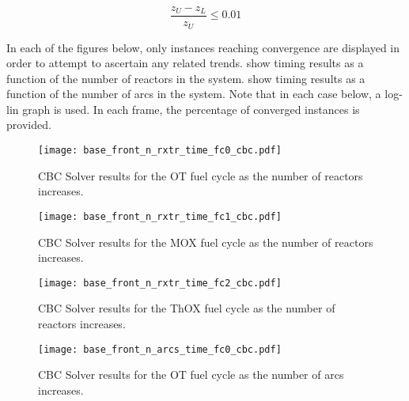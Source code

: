 \begin{equation}\label{eqn:ratio_gap}
\frac{z_U - z_L}{z_U} \leq 0.01
\end{equation}

In each of the figures below, only instances reaching convergence are displayed
in order to attempt to ascertain any related
trends. 
show timing results as a function of the number of reactors in the
system. 
show timing results as a function of the number of arcs in the system. Note that
in each case below, a log-lin graph is used. In each frame, the percentage of
converged instances is provided.

\begin{figure}[h!]
  \begin{center}
    \texttt{[image: base\_front\_n\_rxtr\_time\_fc0\_cbc.pdf]}
    \caption{
      \label{fig:base_front_n_rxtr_time_fc0_cbc}
      CBC Solver results for the OT fuel cycle as the number of reactors
      increases.
      }
  \end{center}
\end{figure}

\begin{figure}[h!]
  \begin{center}
    \texttt{[image: base\_front\_n\_rxtr\_time\_fc1\_cbc.pdf]}
    \caption{
      \label{fig:base_front_n_rxtr_time_fc1_cbc}
      CBC Solver results for the MOX fuel cycle as the number of reactors
      increases.
      }
  \end{center}
\end{figure}

\begin{figure}[h!]
  \begin{center}
    \texttt{[image: base\_front\_n\_rxtr\_time\_fc2\_cbc.pdf]}
    \caption{
      \label{fig:base_front_n_rxtr_time_fc2_cbc}
      CBC Solver results for the ThOX fuel cycle as the number of reactors
      increases.
      }
  \end{center}
\end{figure}

\begin{figure}[h!]
  \begin{center}
    \texttt{[image: base\_front\_n\_arcs\_time\_fc0\_cbc.pdf]}
    \caption{
      \label{fig:base_front_n_arcs_time_fc0_cbc}
      CBC Solver results for the OT fuel cycle as the number of arcs
      increases.
      }
  \end{center}
\end{figure}

